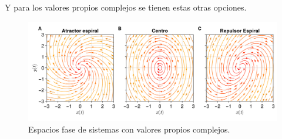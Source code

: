 Y para los valores propios complejos se tienen estas otras opciones.
\begin{figure}[h!]
	\centering
	\includegraphics[scale=0.23]{../Imagenes/Espacios fase complejos}
	\caption{Espacios fase de sistemas con valores propios complejos.}
	\label{fig:EFComplejos}
\end{figure}

